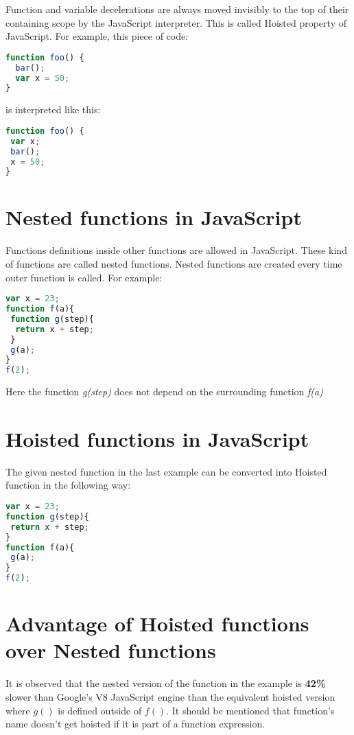 \documentclass[accentcolor=tud0b,12pt,paper=a4]{tudreport}
\begin{document}
Function and variable decelerations are always moved invisibly to the top of their containing scope by the JavaScript interpreter. This is called Hoisted property of JavaScript. For example, this piece of code:
\begin{lstlisting}[language=JavaScript]
function foo() {
  bar();
  var x = 50;
}
\end{lstlisting}

is interpreted like this:
\begin{lstlisting}[language=JavaScript]
function foo() {
 var x;
 bar();
 x = 50;
}
\end{lstlisting}

\section{Nested functions in JavaScript}
Functions definitions inside other functions are allowed in JavaScript. These kind of functions are called  nested functions. Nested functions are created every time outer function is called. For example:
\begin{lstlisting}[language=JavaScript]
var x = 23;
function f(a){
 function g(step){
  return x + step;
 }
 g(a);
}
f(2);
\end{lstlisting}

Here the function \emph{g(step)} does not depend on the surrounding function \emph{f(a)}
\section{Hoisted functions in JavaScript}
The given nested function in the last example can be converted into Hoisted function in the following way: 
\begin{lstlisting}[language=JavaScript]
var x = 23;
function g(step){
 return x + step;
}
function f(a){
 g(a);
}
f(2);
\end{lstlisting}

\section{Advantage of Hoisted functions over Nested functions}
It is observed that the nested version of the function in the example is \textbf{42\%} slower than Google's V8 JavaScript engine than the equivalent hoisted version where $g()$ is defined outside of $f()$. It should be mentioned that function's name doesn't get hoisted if it is part of a function expression.
\end{document}
